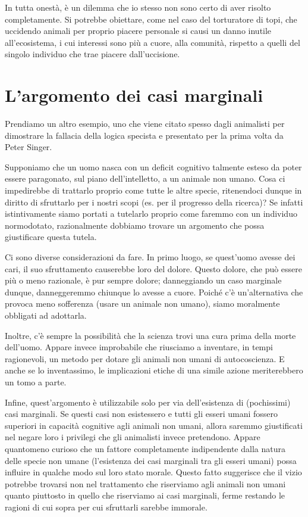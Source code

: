 \documentclass[a4paper,11pt,oneside,article]{memoir}
\begin{document}
In tutta onestà, è un dilemma che io stesso non sono certo di aver risolto
completamente. Si potrebbe obiettare, come nel caso del torturatore di topi, che
uccidendo animali per proprio piacere personale si causi un danno inutile
all'ecosistema, i cui interessi sono più a cuore, alla comunità, rispetto a
quelli del singolo individuo che trae piacere dall'uccisione.

\section{L'argomento dei casi marginali}

Prendiamo un altro esempio, uno che viene citato spesso dagli animalisti per
dimostrare la fallacia della logica specista e presentato per la prima volta da
Peter Singer.

Supponiamo che un uomo nasca con un deficit cognitivo talmente esteso da poter
essere paragonato, sul piano dell'intelletto, a un animale non umano. Cosa ci
impedirebbe di trattarlo proprio come tutte le altre specie, ritenendoci dunque
in diritto di sfruttarlo per i nostri scopi (es. per il progresso della
ricerca)? Se infatti istintivamente siamo portati a tutelarlo proprio come
faremmo con un individuo normodotato, razionalmente dobbiamo trovare un
argomento che possa giustificare questa tutela.

Ci sono diverse considerazioni da fare. In primo luogo, se quest'uomo avesse dei
cari, il suo sfruttamento causerebbe loro del dolore. Questo dolore, che può
essere più o meno razionale, è pur sempre dolore; danneggiando un caso marginale
dunque, danneggeremmo chiunque lo avesse a cuore. Poiché c'è un'alternativa che
provoca meno sofferenza (usare un animale non umano), siamo moralmente obbligati
ad adottarla.

Inoltre, c'è sempre la possibilità che la scienza trovi una cura prima della
morte dell'uomo. Appare invece improbabile che riusciamo a inventare, in tempi
ragionevoli, un metodo per dotare gli animali non umani di autocoscienza. E
anche se lo inventassimo, le implicazioni etiche di una simile azione
meriterebbero un tomo a parte.

Infine, quest'argomento è utilizzabile solo per via dell'esistenza di
(pochissimi) casi marginali. Se questi casi non esistessero e tutti gli esseri
umani fossero superiori in capacità cognitive agli animali non umani, allora
saremmo giustificati nel negare loro i privilegi che gli animalisti invece
pretendono. Appare quantomeno curioso che un fattore completamente indipendente
dalla natura delle specie non umane (l'esistenza dei casi marginali tra gli
esseri umani) possa influire in qualche modo sul loro stato morale. Questo fatto
suggerisce che il vizio potrebbe trovarsi non nel trattamento che riserviamo
agli animali non umani quanto piuttosto in quello che riserviamo ai casi
marginali, ferme restando le ragioni di cui sopra per cui sfruttarli sarebbe
immorale.
\end{document}
